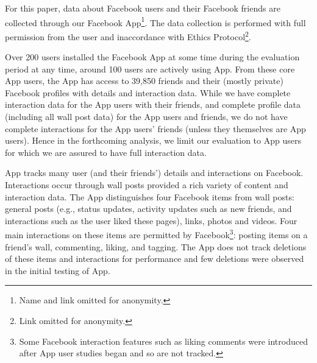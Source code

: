 For this paper, data about Facebook users and their Facebook friends
are collected through our Facebook App\footnote{Name and link omitted
for anonymity.}.  The data collection is performed with full
permission from the user and inaccordance with Ethics
Protocol\footnote{Link omitted for anonymity.}.

Over 200 users installed the Facebook App at some time during the
evaluation period at any time, around 100 users are actively using
App. From these core App users, the App has access to 39,850 friends
and their (mostly private) Facebook profiles with details and
interaction data.  While we have complete interaction data for the App
users with their friends, and complete profile data (including all
wall post data) for the App users and friends, we do not have complete
interactions for the App users' friends (unless they themselves are
App users).  Hence in the forthcoming analysis, we limit our
evaluation to App users for which we are assured to have full
interaction data.

App tracks many user (and their friends') details and interactions on
Facebook. Interactions occur through wall posts provided a rich
variety of content and interaction data.  The App distinguishes four
Facebook items from wall posts: general posts (e.g., status updates,
activity updates such as new friends, and interactions such as the
user liked these pages), links, photos and videos. Four main
interactions on these items are permitted by Facebook\footnote{Some
Facebook interaction features such as liking comments were introduced
after App user studies began and so are not tracked.}: posting items
on a friend's wall, commenting, liking, and tagging.  The App does not
track deletions of these items and interactions for performance and
few deletions were observed in the initial testing of App.



